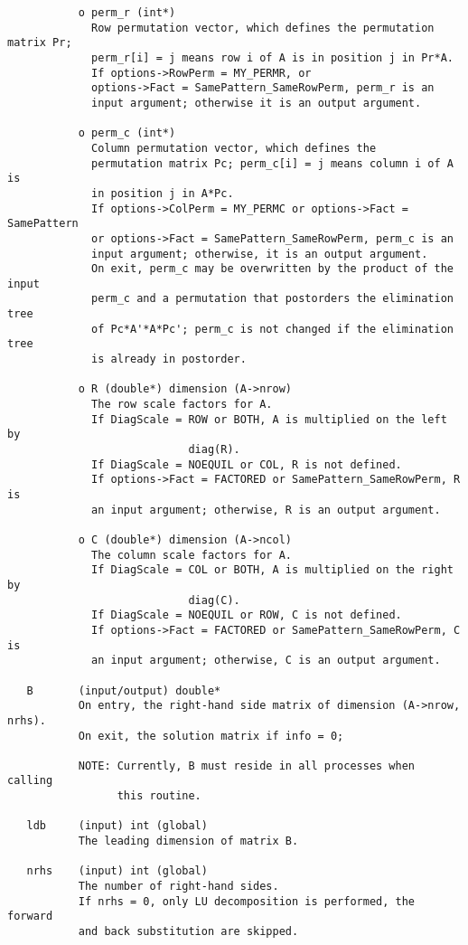 \begin{verbatim}
           o perm_r (int*)
             Row permutation vector, which defines the permutation matrix Pr;
             perm_r[i] = j means row i of A is in position j in Pr*A.
             If options->RowPerm = MY_PERMR, or
             options->Fact = SamePattern_SameRowPerm, perm_r is an
             input argument; otherwise it is an output argument.
  
           o perm_c (int*)
             Column permutation vector, which defines the 
             permutation matrix Pc; perm_c[i] = j means column i of A is 
             in position j in A*Pc.
             If options->ColPerm = MY_PERMC or options->Fact = SamePattern
             or options->Fact = SamePattern_SameRowPerm, perm_c is an
             input argument; otherwise, it is an output argument.
             On exit, perm_c may be overwritten by the product of the input
             perm_c and a permutation that postorders the elimination tree
             of Pc*A'*A*Pc'; perm_c is not changed if the elimination tree
             is already in postorder.
  
           o R (double*) dimension (A->nrow)
             The row scale factors for A.
             If DiagScale = ROW or BOTH, A is multiplied on the left by 
                            diag(R).
             If DiagScale = NOEQUIL or COL, R is not defined.
             If options->Fact = FACTORED or SamePattern_SameRowPerm, R is
             an input argument; otherwise, R is an output argument.
  
           o C (double*) dimension (A->ncol)
             The column scale factors for A.
             If DiagScale = COL or BOTH, A is multiplied on the right by 
                            diag(C).
             If DiagScale = NOEQUIL or ROW, C is not defined.
             If options->Fact = FACTORED or SamePattern_SameRowPerm, C is
             an input argument; otherwise, C is an output argument.
           
   B       (input/output) double*
           On entry, the right-hand side matrix of dimension (A->nrow, nrhs).
           On exit, the solution matrix if info = 0;
  
           NOTE: Currently, B must reside in all processes when calling
                 this routine.
  
   ldb     (input) int (global)
           The leading dimension of matrix B.
  
   nrhs    (input) int (global)
           The number of right-hand sides.
           If nrhs = 0, only LU decomposition is performed, the forward
           and back substitution are skipped.
  

\end{verbatim}
